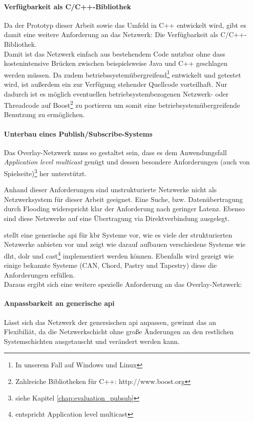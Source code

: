 \paragraph{Verfügbarkeit als C/C++-Bibliothek} Da der Prototyp dieser Arbeit sowie das Umfeld in C++ entwickelt wird, gibt es damit eine weitere Anforderung an das Netzwerk: Die Verfügbarkeit als C/C++-Bibliothek.\\
Damit ist das Netzwerk einfach aus bestehendem Code nutzbar ohne dass kostenintensive Brücken zwischen beispielsweise Java und C++ geschlagen werden müssen. Da zudem betriebssystemübergreifend\footnote{In unserem Fall auf Windows und Linux} entwickelt und getestet wird, ist außerdem ein zur Verfügung stehender Quellcode vorteilhaft. Nur dadurch ist es möglich eventuellen betriebsystembezogenen Netzwerk- oder Threadcode auf  Boost\footnote{Zahlreiche Bibliotheken für C++: http://www.boost.org} zu portieren um somit eine betriebsystemübergreifende Benutzung zu ermöglichen.

\paragraph{Unterbau eines Publish/Subscribe-Systems} Das Overlay-Netzwerk muss so gestaltet sein, dass es dem Anwendungsfall \emph{Application level multicast} genügt und dessen besondere Anforderungen (auch von Spielseite)\footnote{siehe Kapitel \ref{chap:evaluation_pubsub}} her unterstützt.

Anhand dieser Anforderungen sind unstrukturierte Netzwerke nicht als Netzwerksystem für dieser Arbeit geeignet. Eine Suche, bzw. Datenübertragung durch Flooding widerspricht klar der Anforderung nach geringer Latenz. Ebenso sind diese Netzwerke auf eine Übertragung via Direktverbindung ausgelegt.

\cite{Dabek2003Towards} stellt eine generische \ac{api} für \ac{kbr} Systeme vor, wie es viele der strukturierten Netzwerke anbieten vor und zeigt wie darauf aufbauen verschiedene Systeme wie \ac{dht}, \ac{dolr} und \ac{cast}\footnote{entspricht Application level multicast} implementiert werden können. Ebenfalls wird gezeigt wie einige bekannte Systeme (CAN, Chord, Pastry und Tapestry) diese die Anforderungen erfüllen.\\
Daraus ergibt sich eine weitere spezielle Anforderung an das Overlay-Netzwerk:

\paragraph{Anpassbarkeit an generische \ac{api}} Lässt sich das Netzwerk der genersischen \ac{api} anpassen, gewinnt das an Flexibiliät, da die Netzwerkschicht ohne große Änderungen an den restlichen Systemschichten ausgetauscht und verändert werden kann.

